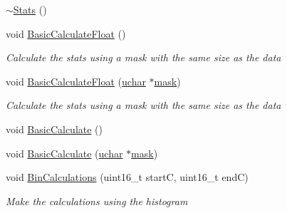 \begin{DoxyCompactItemize}
\hyperlink{class_soil_math_1_1_stats_a7cbfe21964aa7ec3e5c7d42d90400746}{$\sim$\+Stats} ()
\item 
void \hyperlink{class_soil_math_1_1_stats_aabe2c0ee2c46c58d915dc7a6eb2d4b84}{Basic\+Calculate\+Float} ()
\begin{DoxyCompactList}\small\item\em Calculate the stats using a mask with the same size as the data \end{DoxyCompactList}\item 
void \hyperlink{class_soil_math_1_1_stats_a980cb5542a1b783f604b4488c1c0b859}{Basic\+Calculate\+Float} (\hyperlink{_soil_math_types_8h_a65f85814a8290f9797005d3b28e7e5fc}{uchar} $\ast$\hyperlink{_gen_blob_8m_a2f6787d513f2bdbca6833c1c1ee04329}{mask})
\begin{DoxyCompactList}\small\item\em Calculate the stats using a mask with the same size as the data \end{DoxyCompactList}\item 
void \hyperlink{class_soil_math_1_1_stats_ab0c816e596174e53b8e5460b1afce4f9}{Basic\+Calculate} ()
\item 
void \hyperlink{class_soil_math_1_1_stats_a26ff743451ace6be360b4af3ffcf48c6}{Basic\+Calculate} (\hyperlink{_soil_math_types_8h_a65f85814a8290f9797005d3b28e7e5fc}{uchar} $\ast$\hyperlink{_gen_blob_8m_a2f6787d513f2bdbca6833c1c1ee04329}{mask})
\item 
void \hyperlink{class_soil_math_1_1_stats_ae93423b2eb3074051a01c0aee35070f1}{Bin\+Calculations} (uint16\+\_\+t start\+C, uint16\+\_\+t end\+C)
\begin{DoxyCompactList}\small\item\em Make the calculations using the histogram \end{DoxyCompactList}\end{DoxyCompactItemize}
